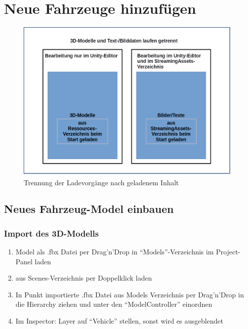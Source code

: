 \chapter{Neue Fahrzeuge hinzufügen}
\label{cha:newentries}
%
\begin{figure}[htp]
	\centering
	\includegraphics[width=0.8\linewidth]{img/new_entries}
	\caption[structure]{Trennung der Ladevorgänge nach geladenem Inhalt}
	\label{fig:newentry}
\end{figure}
%
\section{Neues Fahrzeug-Model einbauen}
%
\subsection{Import des 3D-Modells}
%
\begin{enumerate}
	\item Model als .fbx Datei per Drag'n'Drop in \enquote{Models}-Verzeichnis im Project-Panel laden
	\item \vhs aus Scenes-Verzeichnis per Doppelklick laden
	\item In Punkt importierte .fbx Datei aus Models Verzeichnis per Drag'n'Drop in die Hierarchy ziehen und unter den \enquote{ModelController} einordnen
	\item Im Inspector: Layer auf \enquote{Vehicle} stellen, sonst wird es ausgeblendet
\end{enumerate}
%
\newpage
